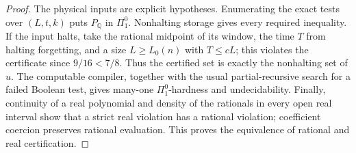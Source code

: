 \begin{proof}
The physical inputs are explicit hypotheses. Enumerating the exact tests over $(L,t,k)$ puts
$P_{\mathbb Q}$ in $\Pi^0_1$. Nonhalting storage gives every required
inequality. If the input halts, take the rational midpoint of its window,
the time $T$ from halting forgetting, and a size $L\ge L_0(n)$ with
$T\le cL$; this violates the certificate since $9/16<7/8$. Thus the
certified set is exactly the nonhalting set of $u$. The computable
compiler, together with the usual partial-recursive search for a failed
Boolean test, gives many-one $\Pi^0_1$-hardness and undecidability.
Finally, continuity of a real polynomial and density of the rationals in
every open real interval show that a strict real violation has a rational
violation; coefficient coercion preserves rational evaluation. This proves
the equivalence of rational and real certification.
\end{proof}

